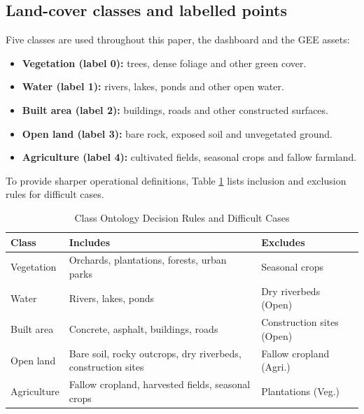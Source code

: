 \documentclass[conference]{IEEEtran}
\begin{document}
\subsection{Land-cover classes and labelled points}
\label{sec:labels}
Five classes are used throughout this paper, the dashboard and the GEE assets:
\begin{itemize}
    \item \textbf{Vegetation (label 0):} trees, dense foliage and other green cover.
    \item \textbf{Water (label 1):} rivers, lakes, ponds and other open water.
    \item \textbf{Built area (label 2):} buildings, roads and other constructed surfaces.
    \item \textbf{Open land (label 3):} bare rock, exposed soil and unvegetated ground.
    \item \textbf{Agriculture (label 4):} cultivated fields, seasonal crops and fallow farmland.
\end{itemize}

To provide sharper operational definitions, Table \ref{tab_ontology} lists inclusion and exclusion rules for difficult cases.

\begin{table}[!b]
\caption{Class Ontology Decision Rules and Difficult Cases}
\begin{center}
\begin{tabular}{p{2cm}p{3cm}p{2.5cm}}
\toprule
\textbf{Class} & \textbf{Includes} & \textbf{Excludes} \\
\midrule
Vegetation & Orchards, plantations, forests, urban parks & Seasonal crops \\
Water & Rivers, lakes, ponds & Dry riverbeds (Open) \\
Built area & Concrete, asphalt, buildings, roads & Construction sites (Open) \\
Open land & Bare soil, rocky outcrops, dry riverbeds, construction sites & Fallow cropland (Agri.) \\
Agriculture & Fallow cropland, harvested fields, seasonal crops & Plantations (Veg.) \\
\bottomrule
\end{tabular}
\label{tab_ontology}
\end{center}
\end{table}
\end{document}
